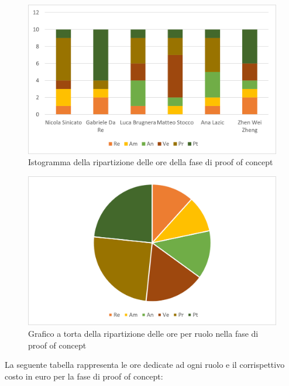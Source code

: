 \begin{figure}[H]
    \centering
    \includegraphics[scale=0.6]{img/grafi preventivo/istogrammi/proof/complessivo.png}
    \caption{Istogramma della ripartizione delle ore della fase di proof of concept}
\end{figure}
\begin{figure}[H]
    \centering
    \includegraphics[scale=0.6]{img/grafi preventivo/torta/proof/complessivo.png}
    \caption{Grafico a torta della ripartizione delle ore per ruolo nella fase di proof of concept}
\end{figure}
La seguente tabella rappresenta le ore dedicate ad ogni ruolo e il corrispettivo costo in euro per la fase di proof of concept:

